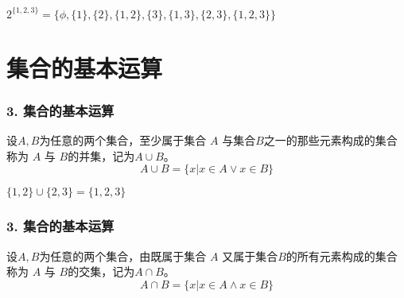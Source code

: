 \documentclass{beamer}
\begin{document}
\begin{CJK*}{UTF8}{gbsn}
\begin{frame}
\begin{Ex}
  $2^{\{1,2,3\}}=\{\phi, \{1\},\{2\},\{1,2\},\{3\},\{1,3\},\{2,3\},\{1,2,3\}\}$
\end{Ex}
\end{frame}
\section{集合的基本运算}
\begin{frame}
  \frametitle{3. 集合的基本运算}
\begin{minipage}{0.69\linewidth}
  \begin{Def}
    设$A,B$为任意的两个集合，至少属于集合 $A$ 与集合$B$之一的那些元素构成的集合称为 $A$ 与 $B$的\alert{并集}，记为$A \cup B$。
    \begin{equation*}
      A\cup B = \{x|x \in A \lor x \in B\}
    \end{equation*}
  \end{Def}\pause
\end{minipage}
\begin{minipage}{0.29\linewidth}
  \end{minipage}\pause
    \begin{Ex}
        $\{1,2\} \cup \{2,3\} = \{1,2,3\}$
    \end{Ex}
\end{frame}
\begin{frame}
  \frametitle{3. 集合的基本运算}
\begin{minipage}{0.69\linewidth}
  \begin{Def}
    设$A,B$为任意的两个集合，由既属于集合 $A$ 又属于集合$B$的所有元素构成的集合称为 $A$ 与 $B$的\alert{交集}，记为$A \cap B$。
    \begin{equation*}
      A\cap B = \{x|x \in A \land x \in B\}
    \end{equation*}
  \end{Def}\pause
\end{minipage}
\begin{minipage}{0.29\linewidth}
\end{minipage}
\end{frame}
\end{CJK*}
\end{document}

